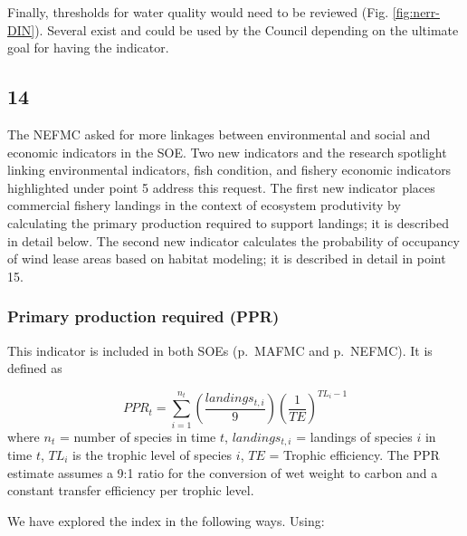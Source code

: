 \documentclass[
  10pt,
]{article}
\begin{document}
Finally, thresholds for water quality would need to be reviewed (Fig.
\ref{fig:nerr-DIN}). Several exist and could be used by the Council
depending on the ultimate goal for having the indicator.

\hypertarget{section-13}{%
\subsection{14}\label{section-13}}

The NEFMC asked for more linkages between environmental and social and
economic indicators in the SOE. Two new indicators and the research
spotlight linking environmental indicators, fish condition, and fishery
economic indicators highlighted under point 5 address this request. The
first new indicator places commercial fishery landings in the context of
ecosystem produtivity by calculating the primary production required to
support landings; it is described in detail below. The second new
indicator calculates the probability of occupancy of wind lease areas
based on habitat modeling; it is described in detail in point 15.

\hypertarget{primary-production-required-ppr}{%
\subsubsection{Primary production required
(PPR)}\label{primary-production-required-ppr}}

This indicator is included in both SOEs (p.~MAFMC and p.~NEFMC). It is
defined as

\[PPR_t = \sum_{i=1}^{n_t}  \left(\frac{landings_{t,i}}{9}\right) \left(\frac{1}{TE}\right)^{TL_i-1}\]
where \(n_t\) = number of species in time \(t\), \(landings_{t,i}\) =
landings of species \(i\) in time \(t\), \(TL_i\) is the trophic level
of species \(i\), \(TE\) = Trophic efficiency. The PPR estimate assumes
a 9:1 ratio for the conversion of wet weight to carbon and a constant
transfer efficiency per trophic level.

We have explored the index in the following ways. Using:
\end{document}
